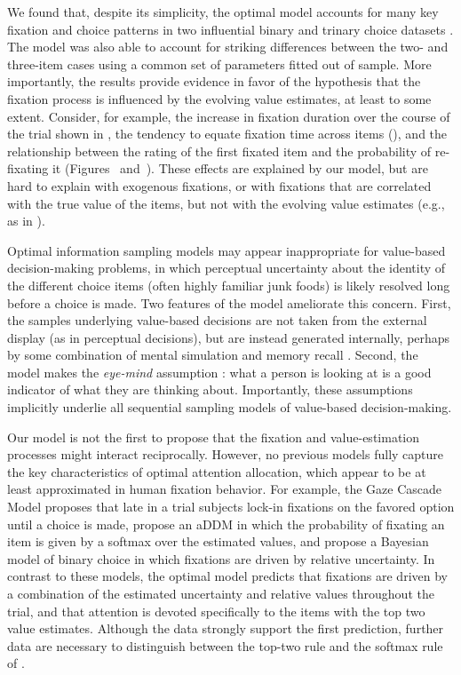 We found that, despite its simplicity, the optimal model accounts for many key fixation and choice patterns in two influential binary and trinary choice datasets \citep{krajbich2010visual,krajbich2011multialternative}. The model was also able to account for striking differences between the two- and three-item cases using a common set of parameters fitted out of sample. More importantly, the results provide evidence in favor of the hypothesis that the fixation process is influenced by the evolving value estimates, at least to some extent. Consider, for example, the increase in fixation duration over the course of the trial shown in , the tendency to equate fixation time across items (), and the relationship between the rating of the first fixated item and the probability of re-fixating it (Figures~ and~). These effects are explained by our model, but are hard to explain with exogenous fixations, or with fixations that are correlated with the true value of the items, but not with the evolving value estimates (e.g., as in \citealp{towal2013simultaneous,stojic2020uncertainty,gluth2018valuebaseda}).

Optimal information sampling models may appear inappropriate for value-based decision-making problems, in which perceptual uncertainty about the identity of the different choice items (often highly familiar junk foods) is likely resolved long before a choice is made. Two features of the model ameliorate this concern. First, the samples underlying value-based decisions are not taken from the external display (as in perceptual decisions), but are instead generated internally, perhaps by some combination of mental simulation and memory recall \citep{biderman2020what,bakkour2019hippocampus,wang2022mixing}. Second, the model makes the \emph{eye-mind} assumption \citep{just1976eye,orquin2013attention}: what a person is looking at is a good indicator of what they are thinking about. Importantly, these assumptions implicitly underlie all sequential sampling models of value-based decision-making.


Our model is not the first to propose that the fixation and value-estimation processes might interact reciprocally. However, no previous models fully capture the key characteristics of optimal attention allocation, which appear to be at least approximated in human fixation behavior. For example, the Gaze Cascade Model \citep{shimojo2003gaze} proposes that late in a trial subjects lock-in fixations on the favored option until a choice is made, \citet{gluth2020valuebased} propose an aDDM in which the probability of fixating an item is given by a softmax over the estimated values, and \citet{song2019proactive} propose a Bayesian model of binary choice in which fixations are driven by relative uncertainty. In contrast to these models, the optimal model predicts that fixations are driven by a combination of the estimated uncertainty and relative values throughout the trial, and that attention is devoted specifically to the items with the top two value estimates. Although the data strongly support the first prediction, further data are necessary to distinguish between the top-two rule and the softmax rule of \citet{gluth2020valuebased}.


